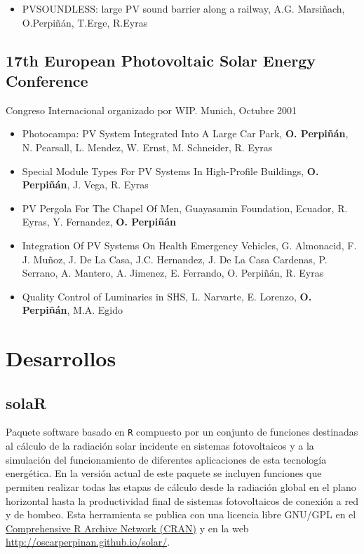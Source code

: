 \documentclass[article, a4paper]{memoir}
\begin{document}
\begin{itemize}
\item PVSOUNDLESS: large PV sound barrier along a railway, A.G. Marsiñach, O.Perpiñán, T.Erge, R.Eyras
\end{itemize}

\subsection{17th European Photovoltaic Solar Energy Conference}
\label{sec-9-19}
Congreso Internacional organizado por WIP. Munich, Octubre 2001

\begin{itemize}
\item Photocampa: PV System Integrated Into A Large Car Park, \textbf{O. Perpiñán}, N. Pearsall, L. Mendez, W. Ernst, M. Schneider, R. Eyras

\item Special Module Types For PV Systems In High-Profile Buildings, \textbf{O. Perpiñán}, J. Vega, R. Eyras

\item PV Pergola For The Chapel Of Men, Guayasamin Foundation, Ecuador, R. Eyras, Y. Fernandez, \textbf{O. Perpiñán}

\item Integration Of PV Systems On Health Emergency Vehicles, G. Almonacid, F. J. Muñoz, J. De La Casa, J.C. Hernandez, J. De La Casa Cardenas, P. Serrano, A. Mantero, A. Jimenez, E. Ferrando, O.  Perpiñán, R. Eyras

\item Quality Control of Luminaries in SHS, L. Narvarte, E. Lorenzo, \textbf{O. Perpiñán}, M.A. Egido
\end{itemize}


\section{Desarrollos}
\label{sec-10}

\subsection{solaR}
\label{sec-10-1}

Paquete software basado en \texttt{R} compuesto por un conjunto de funciones destinadas al cálculo de la radiación solar incidente en sistemas fotovoltaicos y a la simulación del funcionamiento de diferentes aplicaciones de esta tecnología energética. En la versión actual de este paquete se incluyen funciones que permiten realizar todas las etapas de cálculo desde la radiación global en el plano horizontal hasta la productividad final de sistemas fotovoltaicos de conexión a red y de bombeo. Esta herramienta se publica con una licencia libre GNU/GPL en el \href{http://cran.r-project.org/web/packages/solaR/index.html}{Comprehensive R Archive Network (CRAN)} y en la web \url{http://oscarperpinan.github.io/solar/}.
\end{document}
